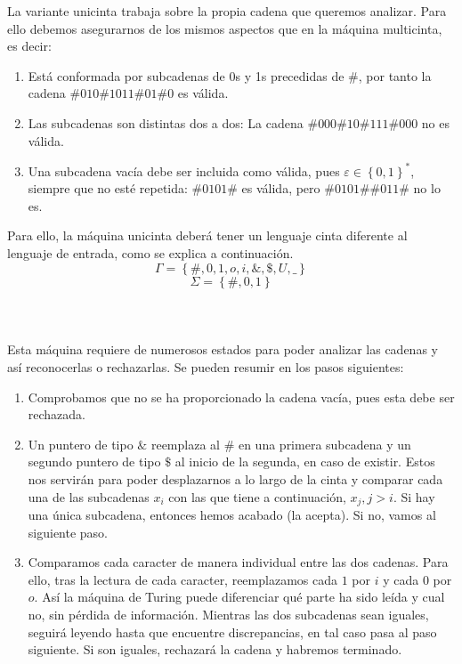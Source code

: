 \documentclass[11pt, a4paper]{exam}
\begin{document}
\begin{questions}
\begin{parts}
        \begin{solution}
            La variante unicinta trabaja sobre la propia cadena que queremos analizar. Para ello debemos asegurarnos de los mismos aspectos que en la máquina multicinta, es decir:
            \begin{enumerate}
                \item Está conformada por subcadenas de 0s y 1s precedidas de $\#$, por tanto la cadena $\#010\#1011\#01\#0$ es válida.
                \item Las subcadenas son distintas dos a dos: La cadena $\#000\#10\#111\#000$ no es válida.
                \item Una subcadena vacía debe ser incluida como válida, pues $\varepsilon \in \left\lbrace 0, 1 \right\rbrace^*$, siempre que no esté repetida: $\#0101\#$ es válida, pero $\#0101\#\#011\#$ no lo es.
            \end{enumerate}
            Para ello, la máquina unicinta deberá tener un lenguaje cinta diferente al lenguaje de entrada, como se explica a continuación.
            \begin{equation*}
                \Gamma = \left\lbrace \#,0,1,o,i,\&,\$,U,\_ \right\rbrace
            \end{equation*}
            \begin{equation*}
                \Sigma = \left\lbrace \#,0,1 \right\rbrace
            \end{equation*}
            \\
            \\
            \\
            Esta máquina requiere de numerosos estados para poder analizar las cadenas y así reconocerlas o rechazarlas. Se pueden resumir en los pasos siguientes:
            \begin{enumerate}
                \item Comprobamos que no se ha proporcionado la cadena vacía, pues esta debe ser rechazada.
                \item Un puntero de tipo $\&$ reemplaza al $\#$ en una primera subcadena y un segundo puntero de tipo $\$$ al inicio de la segunda, en caso de existir. Estos nos servirán para poder desplazarnos a lo largo de la cinta y comparar cada una de las subcadenas $x_i$ con las que tiene a continuación, $x_j, j>i$. Si hay una única subcadena, entonces hemos acabado (la acepta). Si no, vamos al siguiente paso.
                \item Comparamos cada caracter de manera individual entre las dos cadenas. Para ello, tras la lectura de cada caracter, reemplazamos cada $1$ por $i$ y cada $0$ por $o$. Así la máquina de Turing puede diferenciar qué parte ha sido leída y cual no, sin pérdida de información. Mientras las dos subcadenas sean iguales, seguirá leyendo hasta que encuentre discrepancias, en tal caso pasa al paso siguiente. Si son iguales, rechazará la cadena y habremos terminado.

\end{enumerate}
\end{solution}
\end{parts}
\end{questions}
\end{document}
